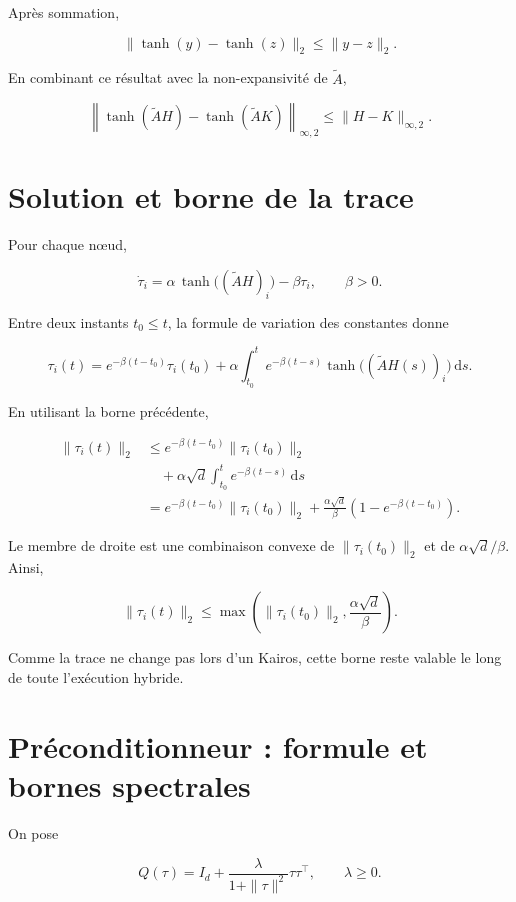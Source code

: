 Après sommation,

\[
\boxed{
\|\tanh(y)-\tanh(z)\|_2
\leq
\|y-z\|_2.
}
\]

En combinant ce résultat avec la non-expansivité de
\(\widetilde A\),

\[
\boxed{
\left\|
\tanh(\widetilde A H)
-
\tanh(\widetilde A K)
\right\|_{\infty,2}
\leq
\|H-K\|_{\infty,2}.
}
\]

\section{Solution et borne de la trace}
\label{annexe-existence-trace}

Pour chaque nœud,

\[
\dot\tau_i
=
\alpha\,\tanh\!\bigl((\widetilde A H)_i\bigr)
-
\beta\tau_i,
\qquad
\beta>0.
\]

Entre deux instants \(t_0\leq t\), la formule de variation des
constantes donne

\[
\tau_i(t)
=
e^{-\beta(t-t_0)}\tau_i(t_0)
+
\alpha
\int_{t_0}^t
e^{-\beta(t-s)}
\tanh\!\bigl((\widetilde A H(s))_i\bigr)
\,\mathrm ds.
\]

En utilisant la borne précédente,

\[
\begin{aligned}
\|\tau_i(t)\|_2
&\leq
e^{-\beta(t-t_0)}
\|\tau_i(t_0)\|_2
\\
&\quad+
\alpha\sqrt d
\int_{t_0}^t
e^{-\beta(t-s)}
\,\mathrm ds
\\
&=
e^{-\beta(t-t_0)}
\|\tau_i(t_0)\|_2
+
\frac{\alpha\sqrt d}{\beta}
\left(
1-e^{-\beta(t-t_0)}
\right).
\end{aligned}
\]

Le membre de droite est une combinaison convexe de
\(\|\tau_i(t_0)\|_2\) et de \(\alpha\sqrt d/\beta\). Ainsi,

\[
\boxed{
\|\tau_i(t)\|_2
\leq
\max\left(
\|\tau_i(t_0)\|_2,
\frac{\alpha\sqrt d}{\beta}
\right).
}
\]

Comme la trace ne change pas lors d'un Kairos, cette borne reste
valable le long de toute l'exécution hybride.

\section{Préconditionneur : formule et bornes spectrales}
\label{annexe-existence-preconditionneur}

On pose

\[
Q(\tau)
=
I_d+
\frac{\lambda}{1+\|\tau\|^2}
\tau\tau^\top,
\qquad
\lambda\geq0.
\]

